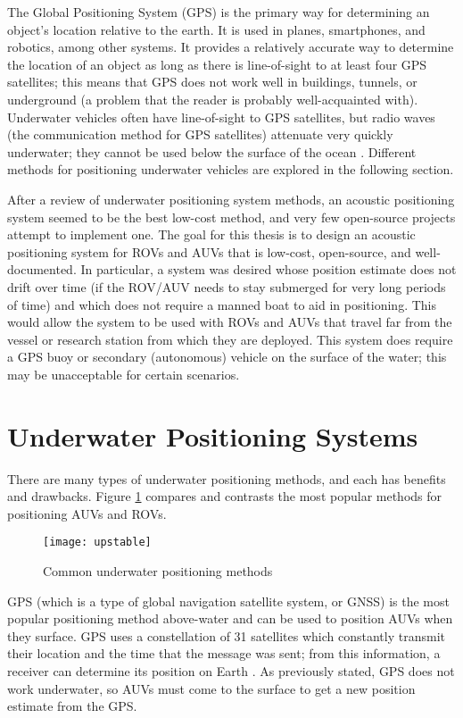 \documentclass[12pt,a4paper]{report}
\begin{document}
The Global Positioning System (GPS) is the primary way for determining an object’s location relative to the earth. It is used in planes, smartphones, and robotics, among other systems. It provides a relatively accurate way to determine the location of an object as long as there is line-of-sight to at least four GPS satellites; this means that GPS does not work well in buildings, tunnels, or underground (a problem that the reader is probably well-acquainted with). Underwater vehicles often have line-of-sight to GPS satellites, but radio waves (the communication method for GPS satellites) attenuate very quickly underwater; they cannot be used below the surface of the ocean \cite{surveyurpn}. Different methods for positioning underwater vehicles are explored in the following section.

After a review of underwater positioning system methods, an acoustic positioning system seemed to be the best low-cost method, and very few open-source projects attempt to implement one. The goal for this thesis is to design an acoustic positioning system for ROVs and AUVs that is low-cost, open-source, and well-documented. In particular, a system was desired whose position estimate does not drift over time (if the ROV/AUV needs to stay submerged for very long periods of time) and which does not require a manned boat to aid in positioning. This would allow the system to be used with ROVs and AUVs that travel far from the vessel or research station from which they are deployed. This system does require a GPS buoy or secondary (autonomous) vehicle on the surface of the water; this may be unacceptable for certain scenarios.

\section{Underwater Positioning Systems} \label{sec:1s2}
There are many types of underwater positioning methods, and each has benefits and drawbacks. Figure \ref{fig:upstable} compares and contrasts the most popular methods for positioning AUVs and ROVs.

\begin{figure}[htbp]
	\centering
	\texttt{[image: upstable]}
	\caption{Common underwater positioning methods}
	\label{fig:upstable}
\end{figure}

GPS (which is a type of global navigation satellite system, or GNSS) is the most popular positioning method above-water and can be used to position AUVs when they surface. GPS uses a constellation of 31 satellites which constantly transmit their location and the time that the message was sent; from this information, a receiver can determine its position on Earth \cite{faagps}. As previously stated, GPS does not work underwater, so AUVs must come to the surface to get a new position estimate from the GPS.
\end{document}
